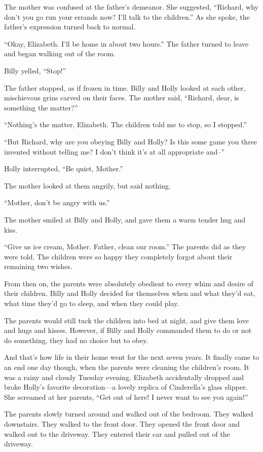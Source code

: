 The mother was confused at the father's demeanor. She suggested, “Richard, why don't you go run your errands now? I'll talk to the children.” As she spoke, the father's expression turned back to normal.

“Okay, Elizabeth. I'll be home in about two hours.” The father turned to leave and began walking out of the room.

Billy yelled, “Stop!”

The father stopped, as if frozen in time. Billy and Holly looked at each other, mischievous grins carved on their faces. The mother said, “Richard, dear, is something the matter?”

“Nothing's the matter, Elizabeth. The children told me to stop, so I stopped.”

“But Richard, why are you obeying Billy and Holly? Is this some game you three invented without telling me? I don't think it's at all appropriate and--”

Holly interrupted, “Be quiet, Mother.”

The mother looked at them angrily, but said nothing.

“Mother, don't be angry with us.”

The mother smiled at Billy and Holly, and gave them a warm tender hug and kiss.

“Give us ice cream, Mother. Father, clean our room.” The parents did as they were told. The children were so happy they completely forgot about their remaining two wishes.

From then on, the parents were absolutely obedient to every whim and desire of their children. Billy and Holly decided for themselves when and what they'd eat, what time they'd go to sleep, and when they could play.

The parents would still tuck the children into bed at night, and give them love and hugs and kisses. However, if Billy and Holly commanded them to do or not do something, they had no choice but to obey.

And that's how life in their home went for the next seven years. It finally came to an end one day though, when the parents were cleaning the children's room. It was a rainy and cloudy Tuesday evening. Elizabeth accidentally dropped and broke Holly's favorite decoration—a lovely replica of Cinderella's glass slipper. She screamed at her parents, “Get out of here! I never want to see you again!”

The parents slowly turned around and walked out of the bedroom. They walked downstairs. They walked to the front door. They opened the front door and walked out to the driveway. They entered their car and pulled out of the driveway.

